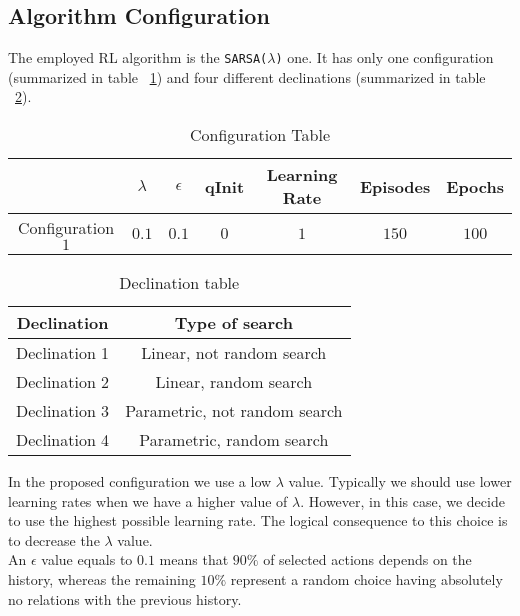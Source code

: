 \subsection{Algorithm Configuration} The employed RL algorithm is the {\tt SARSA($\lambda$)} one. It has only one configuration (summarized in table ~\ref{ConfigurationTable}) and four different declinations (summarized in table ~\ref{DeclinationTable}).

\begin{table} [h!]
	\centering	
	\begin{tabular}{|c|c|c|c|c|c|c|}
		\hline 
		& \textbf{$\lambda$}  & \textbf{$\epsilon$} & \textbf{qInit} & \textbf{Learning Rate}  & \textbf{Episodes}  & \textbf{Epochs} \\ 
		\hline Configuration $1$
		& $0.1$ & $0.1$ & $0$ & $1$  & $150$ & $100$  \\ 
		\hline
	\end{tabular}
\caption{Configuration Table}
\label{ConfigurationTable}
\end{table}

\begin{table} [h!]
	\centering	
	\begin{tabular}{|c|c|}
		\hline \textbf{Declination}
		& \textbf{Type of search} \\ 
		\hline Declination 1
		&  Linear, not random search\\ 
		\hline Declination 2
		& Linear, random search \\ 
		\hline Declination 3
		& Parametric, not random search \\ 
		\hline Declination 4
		&  Parametric, random search\\ 
		\hline 
	\end{tabular} 
\caption{Declination table}
\label{DeclinationTable}
\end{table}

In the proposed configuration we use a low $\lambda$ value. Typically we should use lower learning rates when we have a higher value of $\lambda$. However, in this case, we decide to use the highest possible learning rate. The logical consequence to this choice is to decrease the $\lambda$ value. \\

An $\epsilon$ value equals to $0.1$ means that $90\%$ of selected actions depends on the history, whereas the remaining $10\%$ represent a random choice having absolutely no relations with the previous history. \\ 

